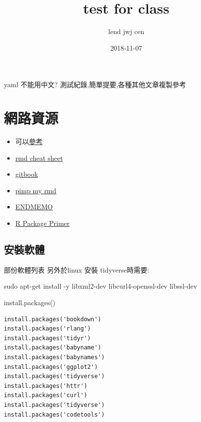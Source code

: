 \documentclass[]{book}
\title{test for class}
\author{lend jwj cen}
\date{2018-11-07}
\newenvironment{Shaded}{\begin{snugshade}}{\end{snugshade}}
\newcommand{\FunctionTok}[1]{\textcolor[rgb]{0.00,0.00,0.00}{#1}}
\newcommand{\NormalTok}[1]{#1}
\providecommand{\tightlist}{%
  \setlength{\itemsep}{0pt}\setlength{\parskip}{0pt}}
\theoremstyle{definition}
\theoremstyle{definition}
\theoremstyle{definition}
\theoremstyle{remark}
\begin{document}
\maketitle

{
\setcounter{tocdepth}{1}
\tableofcontents
}
yaml 不能用中文? 測試紀錄,簡單提要,各種其他文章複製參考

\chapter{網路資源}

\begin{itemize}
\tightlist
\item
  可以\href{https://github.com/rstudio/rstudio-conf/tree/master/2017/Advanced\%20R\%20Markdown\%20-\%20Yihui\%20Xie}{參考}
\item
  \href{https://www.rstudio.com/wp-content/uploads/2016/03/rmarkdown-cheatsheet-2.0.pdf}{rmd
  cheat sheet}
\item
  \href{https://www.r-bloggers.com/using-gitbook-with-r-markdown/}{gitbook}
\item
  \href{https://holtzy.github.io/Pimp-my-rmd/\#link}{pimp my rmd}
\item
  \href{http://www.endmemo.com/program/R/grepl.php}{ENDMEMO}
\item
  \href{http://kbroman.org/pkg_primer/}{R Package Primer}
\end{itemize}

\section{安裝軟體}

部份軟體列表 另外於linux 安裝 tidyverse時需要:

\begin{Shaded}
\begin{Highlighting}[]
\FunctionTok{sudo}\NormalTok{ apt-get install -y libxml2-dev libcurl4-openssl-dev libssl-dev}
\end{Highlighting}
\end{Shaded}

install.packages()

\begin{verbatim}
install.packages('bookdown')
install.packages('rlang')
install.packages('tidyr')
install.packages('babyname')
install.packages('babynames')
install.packages('ggplot2')
install.packages('tidyverse')
install.packages('httr')
install.packages('curl')
install.packages('tidyverse')
install.packages('codetools')
\end{verbatim}
\end{document}
